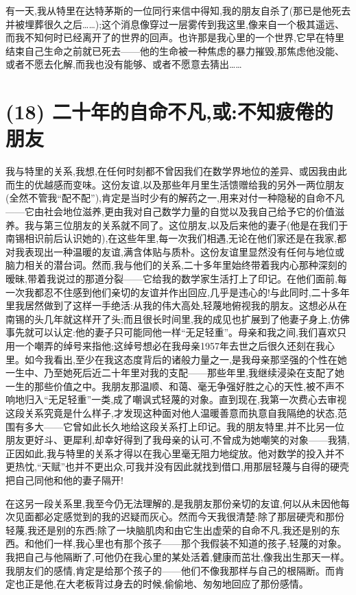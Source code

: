 有一天,我从特里在达特茅斯的一位同行来信中得知,我的朋友自杀了(那已是他死去并被埋葬很久之后……);这个消息像穿过一层雾传到我这里,像来自一个极其遥远、而我不知何时已经离开了的世界的回声。也许那是我心里的一个世界,它早在特里结束自己生命之前就已死去——他的生命被一种焦虑的暴力摧毁,那焦虑他没能、或者不愿去化解,而我也没有能够、或者不愿意去猜出……

\section{(18) 二十年的自命不凡,或:不知疲倦的朋友}

我与特里的关系,我想,在任何时刻都不曾因我们在数学界地位的差异、或因我由此而生的优越感而变味。这份友谊,以及那些年月里生活馈赠给我的另外一两位朋友(全然不管我“配不配”),肯定是当时少有的解药之一,用来对付一种隐秘的自命不凡——它由社会地位滋养,更由我对自己数学力量的自觉以及我自己给予它的价值滋养。我与第三位朋友的关系就不同了。这位朋友,以及后来他的妻子(他是在我们于南锡相识前后认识她的),在这些年里,每一次我们相遇,无论在他们家还是在我家,都对我表现出一种温暖的友谊,满含体贴与质朴。这份友谊里显然没有任何与地位或脑力相关的潜台词。然而,我与他们的关系,二十多年里始终带着我内心那种深刻的暧昧,带着我说过的那道分裂——它给我的数学家生活打上了印记。在他们面前,每一次我都忍不住感到他们亲切的友谊并作出回应,几乎是违心的!与此同时,二十多年里我居然做到了这样一手绝活:从我的伟大高处,轻蔑地俯视我的朋友。这想必从在南锡的头几年就这样开了头;而且很长时间里,我的成见也扩展到了他妻子身上,仿佛事先就可以认定:他的妻子只可能同他一样“无足轻重”。母亲和我之间,我们喜欢只用一个嘲弄的绰号来指他;这绰号想必在我母亲1957年去世之后很久还刻在我心里。如今我看出,至少在我这态度背后的诸般力量之一,是我母亲那坚强的个性在她一生中、乃至她死后近二十年里对我的支配——那些年里,我继续浸染在支配了她一生的那些价值之中。我朋友那温顺、和蔼、毫无争强好胜之心的天性,被不声不响地归入“无足轻重”一类,成了嘲讽式轻蔑的对象。直到现在,我第一次费心去审视这段关系究竟是什么样子,才发现这种面对他人温暖善意而执意自我隔绝的状态,范围有多大——它曾如此长久地给这段关系打上印记。我的朋友特里,并不比另一位朋友更好斗、更犀利,却幸好得到了我母亲的认可,不曾成为她嘲笑的对象——我猜,正因如此,我与特里的关系才得以在我心里毫无阻力地绽放。他对数学的投入并不更热忱,“天赋”也并不更出众,可我并没有因此就找到借口,用那层轻蔑与自得的硬壳把自己同他和他的妻子隔开!

在这另一段关系里,我至今仍无法理解的,是我朋友那份亲切的友谊,何以从未因他每次见面都必定感觉到的我的迟疑而灰心。然而今天我很清楚:除了那层硬壳和那份轻蔑,我还是别的东西;除了一块脑肌肉和由它生出虚荣的自命不凡,我还是别的东西。和他们一样,我心里也有那个孩子——那个我假装不知道的孩子,轻蔑的对象。我把自己与他隔断了,可他仍在我心里的某处活着,健康而茁壮,像我出生那天一样。我朋友们的感情,肯定是给那个孩子的——他们不像我那样与自己的根隔断。而肯定也正是他,在大老板背过身去的时候,偷偷地、匆匆地回应了那份感情。

